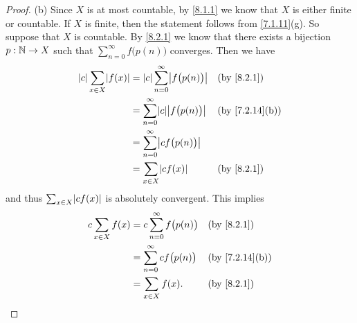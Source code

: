 \begin{proof}{(b)}
  Since \(X\) is at most countable, by \cref{8.1.1} we know that \(X\) is either finite or countable.
  If \(X\) is finite, then the statement follows from \cref{7.1.11}(g).
  So suppose that \(X\) is countable.
  By \cref{8.2.1} we know that there exists a bijection \(p : \mathbb{N} \to X\) such that \(\sum_{n = 0}^\infty f\big(p(n)\big)\) converges.
  Then we have
  \begin{align*}
    \abs{c} \sum_{x \in X} \abs{f(x)} & = \abs{c} \sum_{n = 0}^\infty \abs{f\big(p(n)\big)} &  & \by{8.2.1}                   \\
                                      & = \sum_{n = 0}^\infty \abs{c} \abs{f\big(p(n)\big)} &  & \text{(by \cref{7.2.14}(b))} \\
                                      & = \sum_{n = 0}^\infty \abs{c f\big(p(n)\big)}                                         \\
                                      & = \sum_{x \in X} \abs{c f(x)}                       &  & \by{8.2.1}
  \end{align*}
  and thus \(\sum_{x \in X} \abs{c f(x)}\) is absolutely convergent.
  This implies
  \begin{align*}
    c \sum_{x \in X} f(x) & = c \sum_{n = 0}^\infty f\big(p(n)\big) &  & \by{8.2.1}                   \\
                          & = \sum_{n = 0}^\infty c f\big(p(n)\big) &  & \text{(by \cref{7.2.14}(b))} \\
                          & = \sum_{x \in X} f(x).                  &  & \by{8.2.1}
  \end{align*}
\end{proof}

